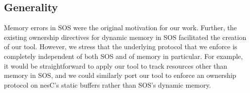 \subsection{Generality}

Memory errors in SOS were the original motivation for our work.
Further, the existing ownership directives for dynamic
memory in SOS facilitated the creation of our tool.  However, we stress that
the underlying protocol that we enforce
is completely independent of both SOS and of
memory in particular.  For example, it would be straightforward to
apply our tool to track resources other than memory in SOS, and
we could similarly port our tool to enforce an ownership protocol on
nesC's static buffers rather than
SOS's dynamic memory.

